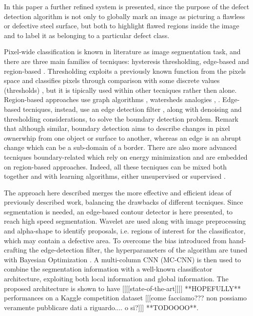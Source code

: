     \par{
        In this paper a further refined system is presented, since the purpose of the defect detection algorithm is not only to globally mark an image as picturing a flawless or defective steel surface, but both to highlight flawed regions inside the image and to label it as belonging to a particular defect class.
    }
    \par{
        Pixel-wide classification is known in literature as image segmentation task, and there are three main families of tecniques: hysteresis thresholding, edge-based and region-based \cite{ieee:7684170}. Thresholding exploits a previously known function from the pixels space and classifies pixels through comparison with some discrete values (thresholds) \cite{ieee:4310039}, but it is tipically used within other tecniques rather then alone. Region-based approaches use graph algorithms \cite{ieee:6205760, ieee:868688}, watersheds analogies \cite{ieee:87344},  . Edge-based tecniques, instead, use an edge detection filter \cite{Klette:2014:CCV:2584519, googlescholar:kovesiphase, researchgate:phase}, along with denoising and thresholding considerations, to solve the boundary detection problem. Remark that although similar, boundary detection aims to describe changes in pixel ownerwhip from one object or surface to another, whereas an edge is an abrupt change which can be a sub-domain of a border. There are also more advanced tecniques \cite{springer:Kass1988} boundary-related which rely on energy minimization and are embedded on region-based approaches. Indeed, all these tecniques can be mixed both together and with learning algorithms, either unsupervised \cite{ieee:7684170} or supervised \cite{ieee:1273918}.
    }
    \par{
        The approach here described merges the more effective and efficient ideas of previously described work, balancing the drawbacks of different tecniques. Since segmentation is needed, an edge-based contour detector is here presented, to reach high speed segmentation. Wavelet are used along with image preprocessing and alpha-shape \cite{springer:10.1007/11907350_46} to identify proposals, i.e. regions of interest for the classificator, which may contain a defective area. To overcome the bias introduced from hand-crafting the edge-detection filter, the hyperparameters of the algorithm are tuned with Bayesian Optimization \cite{arXiv:2018arXiv180702811F, arXiv:2012arXiv1206.2944S, rasmussen:williams:2006}.
        A multi-column CNN (MC-CNN) \cite{ieee:6248110} is then used to combine the segmentation information with a well-known classificator architecture, exploiting both local information and global information. The proposed architecture is shown to have [[[[state-of-the-art]]]] **HOPEFULLY** performances on a Kaggle competition dataset [[[come facciamo??? non possiamo veramente pubblicare dati a riguardo.... o si?]]] **TODOOOO**.
    }